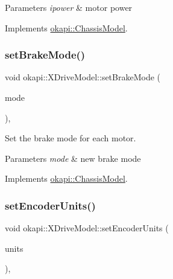 \begin{DoxyParams}{Parameters}
{\em ipower} & motor power \\
\hline
\end{DoxyParams}


Implements \mbox{\hyperlink{classokapi_1_1ChassisModel_af13aa5281c762eb61a444f0b35176014}{okapi\+::\+Chassis\+Model}}.

\mbox{\label{classokapi_1_1XDriveModel_a27356e54c9fd0361d01de4c81ff851e7}} 
\subsubsection{\texorpdfstring{setBrakeMode()}{setBrakeMode()}}
{\footnotesize\ttfamily void okapi\+::\+X\+Drive\+Model\+::set\+Brake\+Mode (\begin{DoxyParamCaption}\item[{\mbox{\hyperlink{classokapi_1_1AbstractMotor_a132e0485dbb59a60c3f934338d8fa601}{Abstract\+Motor\+::brake\+Mode}}}]{mode }\end{DoxyParamCaption})\hspace{0.3cm}{\ttfamily [override]}, {\ttfamily [virtual]}}

Set the brake mode for each motor.


\begin{DoxyParams}{Parameters}
{\em mode} & new brake mode \\
\hline
\end{DoxyParams}


Implements \mbox{\hyperlink{classokapi_1_1ChassisModel_a20e3cde96d536e6c722aa5686e5cc8e8}{okapi\+::\+Chassis\+Model}}.

\mbox{\label{classokapi_1_1XDriveModel_a56b590280c856259ad710e888d8e215c}} 
\subsubsection{\texorpdfstring{setEncoderUnits()}{setEncoderUnits()}}
{\footnotesize\ttfamily void okapi\+::\+X\+Drive\+Model\+::set\+Encoder\+Units (\begin{DoxyParamCaption}\item[{\mbox{\hyperlink{classokapi_1_1AbstractMotor_ae811cd825099f2defadeb1b7f7e7764c}{Abstract\+Motor\+::encoder\+Units}}}]{units }\end{DoxyParamCaption})\hspace{0.3cm}{\ttfamily [override]}, {\ttfamily [virtual]}}

